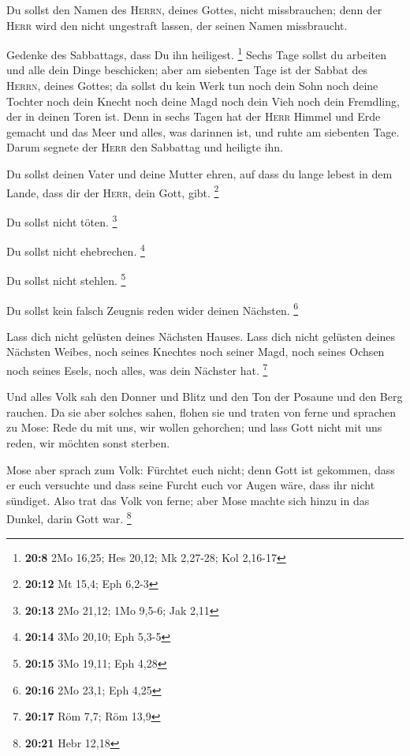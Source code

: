  Du sollst den Namen des \textsc{Herrn}, deines Gottes,
nicht missbrauchen; denn der \textsc{Herr} wird den nicht ungestraft
lassen, der seinen Namen missbraucht.

 Gedenke des Sabbattags, dass Du ihn heiligest.
\footnote{\textbf{20:8} 2Mo 16,25; Hes 20,12; Mk 2,27-28; Kol 2,16-17}
 Sechs Tage sollst du arbeiten und alle dein Dinge
beschicken;  aber am siebenten Tage ist der Sabbat des
\textsc{Herrn}, deines Gottes; da sollst du kein Werk tun noch dein Sohn
noch deine Tochter noch dein Knecht noch deine Magd noch dein Vieh noch
dein Fremdling, der in deinen Toren ist.  Denn in sechs
Tagen hat der \textsc{Herr} Himmel und Erde gemacht und das Meer und
alles, was darinnen ist, und ruhte am siebenten Tage. Darum segnete der
\textsc{Herr} den Sabbattag und heiligte ihn.

 Du sollst deinen Vater und deine Mutter ehren, auf dass
du lange lebest in dem Lande, dass dir der \textsc{Herr}, dein Gott,
gibt. \footnote{\textbf{20:12} Mt 15,4; Eph 6,2-3}

 Du sollst nicht töten. \footnote{\textbf{20:13} 2Mo
  21,12; 1Mo 9,5-6; Jak 2,11}

 Du sollst nicht ehebrechen. \footnote{\textbf{20:14} 3Mo
  20,10; Eph 5,3-5}

 Du sollst nicht stehlen. \footnote{\textbf{20:15} 3Mo
  19,11; Eph 4,28}

 Du sollst kein falsch Zeugnis reden wider deinen
Nächsten. \footnote{\textbf{20:16} 2Mo 23,1; Eph 4,25}

 Lass dich nicht gelüsten deines Nächsten Hauses. Lass
dich nicht gelüsten deines Nächsten Weibes, noch seines Knechtes noch
seiner Magd, noch seines Ochsen noch seines Esels, noch alles, was dein
Nächster hat. \footnote{\textbf{20:17} Röm 7,7; Röm 13,9}

 Und alles Volk sah den Donner und Blitz und den Ton der
Posaune und den Berg rauchen. Da sie aber solches sahen, flohen sie und
traten von ferne  und sprachen zu Mose: Rede du mit uns,
wir wollen gehorchen; und lass Gott nicht mit uns reden, wir möchten
sonst sterben.

 Mose aber sprach zum Volk: Fürchtet euch nicht; denn
Gott ist gekommen, dass er euch versuchte und dass seine Furcht euch vor
Augen wäre, dass ihr nicht sündiget.  Also trat das Volk
von ferne; aber Mose machte sich hinzu in das Dunkel, darin Gott war.
\footnote{\textbf{20:21} Hebr 12,18}

